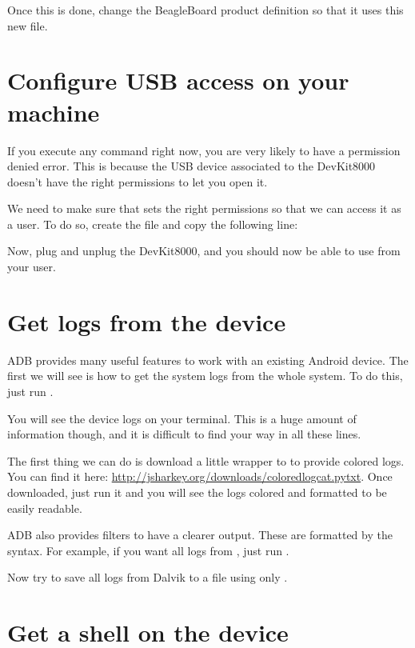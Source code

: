 Once this is done, change the BeagleBoard product definition so that
it uses this new file.

\section{Configure USB access on your machine}

If you execute any command right now, you are very likely to have a
permission denied error. This is because the USB device associated to
the DevKit8000 doesn't have the right permissions to let you open it.

We need to make sure that  sets the right permissions so that we can access
it as a user. To do so, create the file
 and copy the following line:


Now, plug and unplug the DevKit8000, and you should now be able to use
 from your user.

\section{Get logs from the device}

ADB provides many useful features to work with an existing Android device.
The first we will see is how to get the system logs from the whole system. To do
this, just run .

You will see the device logs on your terminal. This is a huge amount of
information though, and it is difficult to find your way in all these lines.

The first thing we can do is download a little wrapper to  to provide colored
logs. You can find it here: \url{http://jsharkey.org/downloads/coloredlogcat.pytxt}. Once downloaded, just run it and you will see the logs colored and
formatted to be easily readable.

ADB also provides filters to have a clearer output. These are formatted by the
 syntax. For example, if you want all logs from ,
just run .

Now try to save all logs from Dalvik to a file using only .

\section{Get a shell on the device}

